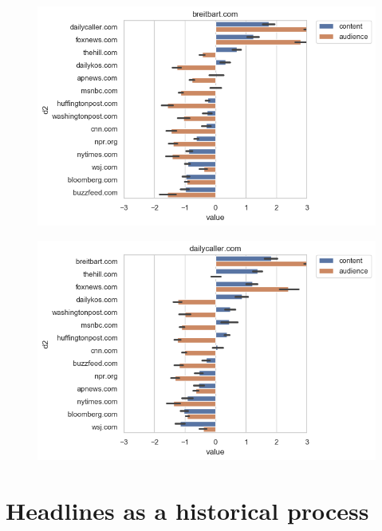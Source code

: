 \documentclass{scrartcl}
\begin{document}
\begin{figure}[H]
  \centering
  \includegraphics[width=\textwidth]{figures/ca-breitbart-composite.png}
\end{figure}

\begin{figure}[H]
  \centering
  \includegraphics[width=\textwidth]{figures/ca-dailycaller-composite.png}
\end{figure}

\section{Headlines as a historical process}
\end{document}
